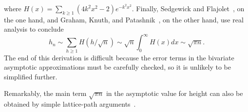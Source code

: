\documentclass[11pt]{article}
\begin{document}
where \(H(x) = \sum_{k \geqslant 1}(4k^2x^2-2)e^{-k^2x^2}\). Finally,
Sedgewick and Flajolet~\cite[\S 5.9]{SedgewickFlajolet:1996}, on the one
hand, and Graham, Knuth, and
Patashnik~\cite[\S 9.6]{GrahamKnuthPatashnik:1994}, on the other hand,
use real analysis to conclude
\begin{equation*}
h_n \sim \sum_{h \geqslant 1}H(h/\!\sqrt{n})
    \sim \sqrt{n} \int_0^{\infty}H(x) dx \sim \sqrt{\pi n}.
\end{equation*}
The end of this derivation is difficult because the error terms in the
bivariate asymptotic approximations must be carefully checked, so it
is unlikely to be simplified further. 

Remarkably, the main term $\sqrt{\pi n}$ in the asymptotic value for
height can also be obtained by simple lattice-path
arguments~\cite{DershowitzZaks:1990}.



\end{document}

